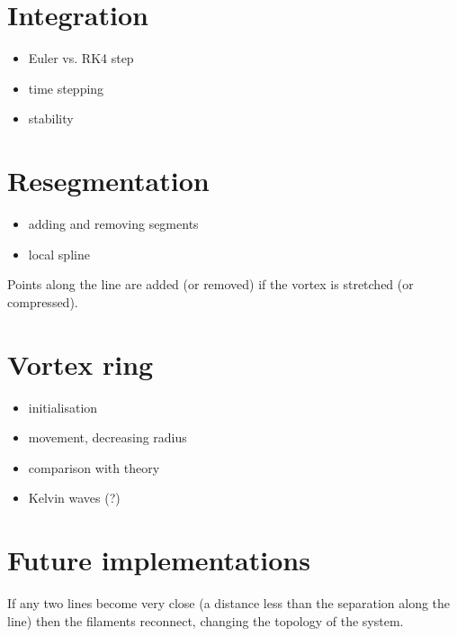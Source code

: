 \section{Integration}
\begin{itemize}
	\item Euler vs. RK4 step
	\item time stepping
	\item stability
\end{itemize}

\section{Resegmentation}
\begin{itemize}
	\item adding and removing segments
	\item local spline
\end{itemize}

Points along the line are added (or removed) if the vortex is stretched (or compressed).

\section{Vortex ring}
\begin{itemize}
	\item initialisation
	\item movement, decreasing radius
	\item comparison with theory
	\item Kelvin waves (?)
\end{itemize}

\section{Future implementations}

If any two lines become very close (a distance less than the separation along the line) then the filaments reconnect, changing the topology of the system.

\newpage
